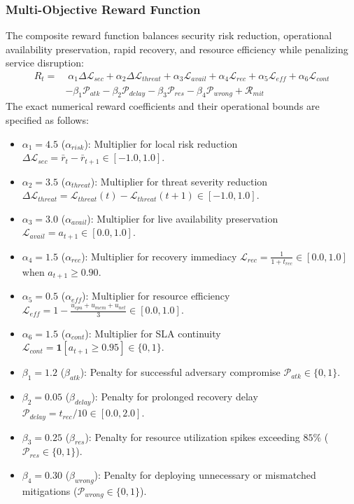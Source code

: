 \documentclass[ASNA,twocolumn]{USG}
\begin{document}
\subsubsection{Multi-Objective Reward Function}
The composite reward function balances security risk reduction, operational availability preservation, rapid recovery, and resource efficiency while penalizing service disruption:
\begin{align}
    R_t = & \; \alpha_1 \Delta \mathcal{L}_{sec} + \alpha_2 \Delta \mathcal{L}_{threat} + \alpha_3 \mathcal{L}_{avail} + \alpha_4 \mathcal{L}_{rec} + \alpha_5 \mathcal{L}_{eff} + \alpha_6 \mathcal{L}_{cont} \nonumber \\
    & - \beta_1 \mathcal{P}_{atk} - \beta_2 \mathcal{P}_{delay} - \beta_3 \mathcal{P}_{res} - \beta_4 \mathcal{P}_{wrong} + \mathcal{R}_{mit}
    \label{eq:reward_function}
\end{align}
The exact numerical reward coefficients and their operational bounds are specified as follows:
\begin{itemize}
    \item $\alpha_1 = 4.5$ ($\alpha_{risk}$): Multiplier for local risk reduction $\Delta \mathcal{L}_{sec} = \bar{r}_t - \bar{r}_{t+1} \in [-1.0, 1.0]$.
    \item $\alpha_2 = 3.5$ ($\alpha_{threat}$): Multiplier for threat severity reduction $\Delta \mathcal{L}_{threat} = \mathcal{L}_{threat}(t) - \mathcal{L}_{threat}(t+1) \in [-1.0, 1.0]$.
    \item $\alpha_3 = 3.0$ ($\alpha_{avail}$): Multiplier for live availability preservation $\mathcal{L}_{avail} = a_{t+1} \in [0.0, 1.0]$.
    \item $\alpha_4 = 1.5$ ($\alpha_{rec}$): Multiplier for recovery immediacy $\mathcal{L}_{rec} = \frac{1}{1 + t_{rec}} \in [0.0, 1.0]$ when $a_{t+1} \ge 0.90$.
    \item $\alpha_5 = 0.5$ ($\alpha_{eff}$): Multiplier for resource efficiency $\mathcal{L}_{eff} = 1 - \frac{u_{cpu} + u_{mem} + u_{net}}{3} \in [0.0, 1.0]$.
    \item $\alpha_6 = 1.5$ ($\alpha_{cont}$): Multiplier for SLA continuity $\mathcal{L}_{cont} = \mathbf{1}[a_{t+1} \ge 0.95] \in \{0, 1\}$.
    \item $\beta_1 = 1.2$ ($\beta_{atk}$): Penalty for successful adversary compromise $\mathcal{P}_{atk} \in \{0, 1\}$.
    \item $\beta_2 = 0.05$ ($\beta_{delay}$): Penalty for prolonged recovery delay $\mathcal{P}_{delay} = t_{rec} / 10 \in [0.0, 2.0]$.
    \item $\beta_3 = 0.25$ ($\beta_{res}$): Penalty for resource utilization spikes exceeding $85\%$ ($\mathcal{P}_{res} \in \{0, 1\}$).
    \item $\beta_4 = 0.30$ ($\beta_{wrong}$): Penalty for deploying unnecessary or mismatched mitigations ($\mathcal{P}_{wrong} \in \{0, 1\}$).
\end{itemize}
\end{document}
